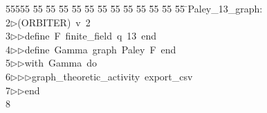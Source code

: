 %
%
\begin{tabbing}
55555 \= 55 \= 55 \= 55 \= 55 \= 55 \= 55 \= 55 \= 55 \= 55 \= 55 \= 55 \= 55 \= \>Paley\_13\_graph:\\[0pt]
2\>$\triangleright$\>(ORBITER)\ v\ 2\ \\[0pt]
3\>$\triangleright$\>$\triangleright$\>define\ F\ finite\_field\ q\ 13\ end\ \\[0pt]
4\>$\triangleright$\>$\triangleright$\>define\ Gamma\ graph\ Paley\ F\ end\ \\[0pt]
5\>$\triangleright$\>$\triangleright$\>with\ Gamma\ do\ \\[0pt]
6\>$\triangleright$\>$\triangleright$\>$\triangleright$\>graph\_theoretic\_activity\ export\_csv\ \\[0pt]
7\>$\triangleright$\>$\triangleright$\>end\\[0pt]
8\>\end{tabbing}
